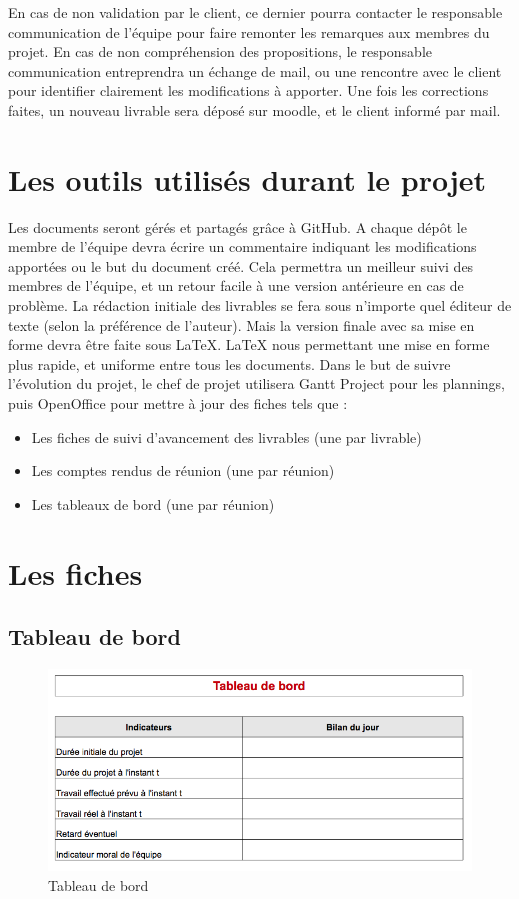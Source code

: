     En cas de non validation par le client, ce dernier pourra contacter le responsable communication de l'équipe pour faire remonter les remarques aux membres du projet. En cas de non compréhension des propositions, le responsable communication entreprendra un échange de mail, ou une rencontre avec le client pour identifier clairement les modifications à  apporter.
    Une fois les corrections faites, un nouveau livrable sera déposé sur moodle, et le client informé par mail.

\section{Les outils utilisés durant le projet}
    Les documents seront gérés et partagés grâce à  GitHub. A chaque dépôt le membre de l'équipe devra écrire un commentaire indiquant les modifications apportées ou le but du document créé. Cela permettra un meilleur suivi des membres de l'équipe, et un retour facile à  une version antérieure en cas de problème.
    La rédaction initiale des livrables se fera sous n'importe quel éditeur de texte (selon la préférence de l'auteur). Mais la version finale avec sa mise en forme devra être faite sous LaTeX. LaTeX nous permettant une mise en forme plus rapide, et uniforme entre tous les documents.
Dans le but de suivre l'évolution du projet, le chef de projet utilisera Gantt Project pour les plannings, puis OpenOffice pour mettre à  jour des fiches tels que  :
\begin{itemize}
    \item Les fiches de suivi d'avancement des livrables (une par livrable)
    \item Les comptes rendus de réunion (une par réunion)
    \item Les tableaux de bord (une par réunion)
\end{itemize}

\pagebreak
\section{Les fiches}
\subsection{Tableau de bord}
\begin{figure}[h]
    \centering
    \includegraphics[width=140mm]{images/TblBord.png}
    \caption{Tableau de bord}
\end{figure}

